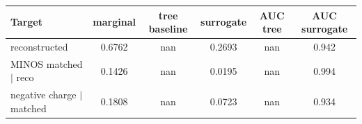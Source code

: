 \begin{tabular}{lccccc}
\toprule
Target & marginal & tree baseline & surrogate & AUC tree & AUC surrogate \\
\midrule
reconstructed & 0.6762 & nan & 0.2693 & nan & 0.942 \\
MINOS matched $\mid$ reco & 0.1426 & nan & 0.0195 & nan & 0.994 \\
negative charge $\mid$ matched & 0.1808 & nan & 0.0723 & nan & 0.934 \\
\bottomrule
\end{tabular}
